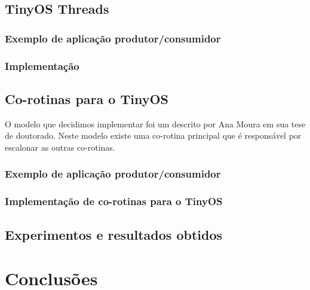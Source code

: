 \documentclass[a4paper, 10pt]{article}
\begin{document}
\subsection{TinyOS Threads} \label{TOSThreads}


    \subsubsection{Exemplo de aplicação produtor/consumidor}
    

    \subsubsection{Implementação}
    

\subsection{Co-rotinas para o TinyOS}\label{modelo-corotinas}
O modelo que decidimos implementar foi um descrito por Ana Moura em sua tese de doutorado\cite[s. 6.2]{Moura/04}.
Neste modelo existe uma co-rotina principal que é responsável por escalonar as outras co-rotinas. 
    
    \subsubsection{Exemplo de aplicação produtor/consumidor}
    

    \subsubsection{Implementação de co-rotinas para o TinyOS}
    

\subsection{Experimentos e resultados obtidos}


\section{Conclusões}\label{conclusoes}

\end{document}
